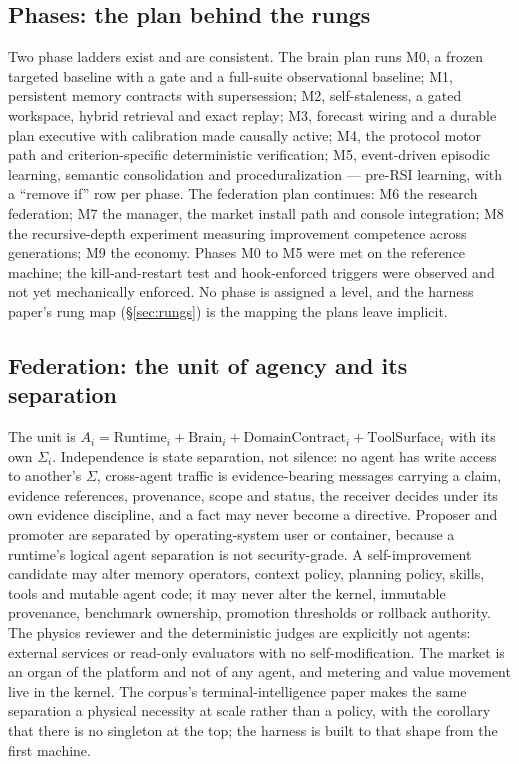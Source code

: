 \documentclass[11pt]{article}
\theoremstyle{definition}
\begin{document}
\subsection{Phases: the plan behind the rungs}

Two phase ladders exist and are consistent. The brain plan runs M0, a frozen targeted baseline with a gate and a full-suite observational baseline; M1, persistent memory contracts with supersession; M2, self-staleness, a gated workspace, hybrid retrieval and exact replay; M3, forecast wiring and a durable plan executive with calibration made causally active; M4, the protocol motor path and criterion-specific deterministic verification; M5, event-driven episodic learning, semantic consolidation and proceduralization --- pre-RSI learning, with a ``remove if'' row per phase. The federation plan continues: M6 the research federation; M7 the manager, the market install path and console integration; M8 the recursive-depth experiment measuring improvement competence across generations; M9 the economy. Phases M0 to M5 were met on the reference machine; the kill-and-restart test and hook-enforced triggers were observed and not yet mechanically enforced. No phase is assigned a level, and the harness paper's rung map (\S\ref{sec:rungs}) is the mapping the plans leave implicit.

\subsection{Federation: the unit of agency and its separation}

The unit is $A_i = \text{Runtime}_i + \text{Brain}_i + \text{DomainContract}_i + \text{ToolSurface}_i$ with its own $\Sigma_i$. Independence is state separation, not silence: no agent has write access to another's $\Sigma$, cross-agent traffic is evidence-bearing messages carrying a claim, evidence references, provenance, scope and status, the receiver decides under its own evidence discipline, and a fact may never become a directive. Proposer and promoter are separated by operating-system user or container, because a runtime's logical agent separation is not security-grade. A self-improvement candidate may alter memory operators, context policy, planning policy, skills, tools and mutable agent code; it may never alter the kernel, immutable provenance, benchmark ownership, promotion thresholds or rollback authority. The physics reviewer and the deterministic judges are explicitly not agents: external services or read-only evaluators with no self-modification. The market is an organ of the platform and not of any agent, and metering and value movement live in the kernel. The corpus's terminal-intelligence paper makes the same separation a physical necessity at scale rather than a policy, with the corollary that there is no singleton at the top; the harness is built to that shape from the first machine.
\end{document}
